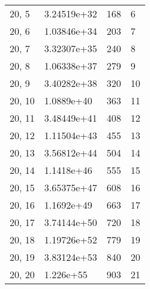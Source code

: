 \begin{table}
\begin{tabular}{llll}
20, 5  &  3.24519e+32 &  168 &     6 \\
20, 6  &  1.03846e+34 &  203 &     7 \\
20, 7  &  3.32307e+35 &  240 &     8 \\
20, 8  &  1.06338e+37 &  279 &     9 \\
20, 9  &  3.40282e+38 &  320 &    10 \\
20, 10 &   1.0889e+40 &  363 &    11 \\
20, 11 &  3.48449e+41 &  408 &    12 \\
20, 12 &  1.11504e+43 &  455 &    13 \\
20, 13 &  3.56812e+44 &  504 &    14 \\
20, 14 &   1.1418e+46 &  555 &    15 \\
20, 15 &  3.65375e+47 &  608 &    16 \\
20, 16 &   1.1692e+49 &  663 &    17 \\
20, 17 &  3.74144e+50 &  720 &    18 \\
20, 18 &  1.19726e+52 &  779 &    19 \\
20, 19 &  3.83124e+53 &  840 &    20 \\
20, 20 &    1.226e+55 &  903 &    21 \\
\bottomrule
\end{tabular}
\end{table}
